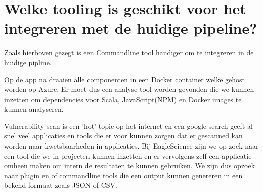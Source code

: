 \section{Welke tooling is geschikt voor het integreren met de huidige pipeline? }
Zoals hierboven gezegt is een Commandline tool handiger om te integreren in de huidige pipline.

Op de app na draaien alle componenten in een Docker container welke gehost worden op Azure. Er moet dus een analyse tool worden gevonden die we kunnen inzetten om dependencies voor Scala, JavaScript(NPM) en Docker images te kunnen analyseren.

Vulnerability scan is een 'hot' topic op het internet en een google search geeft al snel veel applicaties en tools die er voor kunnen zorgen dat er gescanned kan worden naar kwetsbaarheden in applicaties. Bij EagleScience zijn we op zoek naar een tool die we in projecten kunnen inzetten en er vervolgens zelf een applicatie omheen maken om intern de resultaten te kunnen gebruiken. We zijn dus opzoek naar plugin en of commandline tools die een output kunnen genereren in een bekend formaat zoals JSON of CSV\@.
